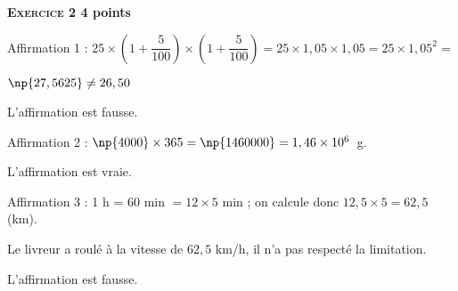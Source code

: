 \textbf{\textsc{Exercice 2} \hfill 4 points}

\medskip

Affirmation 1 : $25 \times \left(1 + \dfrac{5}{100}\right) \times \left(1 + \dfrac{5}{100}\right) = 25 \times 1,05 \times 1,05 = 25 \times 1,05^2 = $

$\np{27,5625} \ne 26,50$

L'affirmation est fausse.

Affirmation 2 : $\np{4000} \times 365 = \np{1460000} = 1,46\times 10^6$~g.

L'affirmation est vraie.

Affirmation 3 : 1 h = 60 min $= 12  \times 5$ min ;  on calcule donc $12,5  \times 5 = 62,5$ (km).

Le livreur a roulé à la vitesse de $62,5$ km/h, il n'a pas respecté la limitation.

L'affirmation est fausse.

\vspace{0,5cm}

